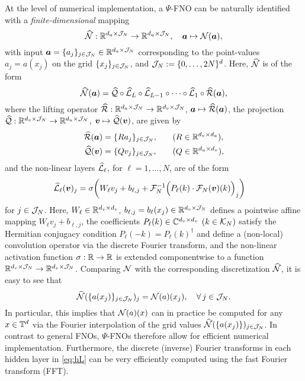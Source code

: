 \documentclass[reqno,a4paper]{amsart}
\begin{document}
At the level of numerical implementation, a {$\Psi$-FNO} can be naturally identified with a \emph{finite-dimensional} mapping
\[
\widehat{\mathcal{N}}: \mathbb{R}^{d_a \times \mathcal{J}_N} \to \mathbb{R}^{d_u \times \mathcal{J}_N}, \quad \bm{a} \mapsto \mathcal{N}(\bm{a}),
\]
with input $\bm{a} = \{a_j\}_{j\in \mathcal{J}_N} \in \mathbb{R}^{d_a\times \mathcal{J}_N}$ corresponding to the point-values $a_j = a(x_j)$ on the grid $\{x_j\}_{j\in \mathcal{J}_N}$, and $\mathcal{J}_N:=\{0,\dots, 2N\}^d$. Here, $\widehat{\mathcal{N}}$ is of the form 
\[
\widehat{\mathcal{N}}(\bm{a}) 
=
\widehat{\mathcal{Q}} \circ \widehat{\mathcal{L}}_L \circ \widehat{\mathcal{L}}_{L-1} \circ \dots \circ \widehat{\mathcal{L}}_1 \circ \widehat{\mathcal{R}}(\bm{a}),
\]
where the lifting operator $\widehat{\mathcal{R}}: \mathbb{R}^{d_a\times \mathcal{J}_N} \to \mathbb{R}^{d_v\times \mathcal{J}_N}$, $\bm{a} \mapsto \widehat{\mathcal{R}}(\bm{a})$, the projection $\widehat{\mathcal{Q}}: \mathbb{R}^{d_v\times \mathcal{J}_N} \to \mathbb{R}^{d_u \times \mathcal{J}_N}$, $\bm{v}\mapsto \widehat{\mathcal{Q}}(\bm{v})$, are given by
\begin{alignat*}{2}
\widehat{\mathcal{R}}(\bm{a}) &= \{Ra_j\}_{j\in \mathcal{J}_N}, && (R \in \mathbb{R}^{d_v\times d_a}),
\\
\widehat{\mathcal{Q}}(\bm{v}) &= \{ Qv_j\}_{j\in \mathcal{J}_N},\quad  && (Q \in \mathbb{R}^{d_u\times d_v}), 
\end{alignat*}
and the non-linear layers $\widehat{\mathcal{L}}_{\ell}$, for $\ell=1,\dots, N$, are of the form 
\begin{align}
\label{eq:hL}
\widehat{\mathcal{L}}_\ell(\bm{v})_j &= 
\sigma\bigg(
W_\ell v_j + b_{\ell,j} + \mathcal{F}_N^{-1}\Big(P_\ell(k) \cdot \mathcal{F}_N(\bm{v})(k)\Big)_j
\bigg)
\end{align}
for $j\in \mathcal{J}_N$. Here, $W_\ell\in \mathbb{R}^{d_v\times d_v}$, $b_{\ell,j} = b_\ell(x_j) \in \mathbb{R}^{d_v \times \mathcal{J}_N}$ defines a pointwise affine mapping $W_\ell v_j + b_{\ell,j}$, the coefficients $P_\ell(k) \in \mathbb{C}^{d_v\times d_v}$ $(k\in \mathcal{K}_N)$ satisfy the Hermitian conjugacy condition $P_\ell(-k) = P_\ell(k)^\dagger$ and define a (non-local) convolution operator via the discrete Fourier transform, and the non-linear activation function $\sigma: \mathbb{R} \to \mathbb{R}$ is extended componentwise to a function $\mathbb{R}^{d_v\times \mathcal{J}_N} \to \mathbb{R}^{d_v\times \mathcal{J}_N}$. Comparing $\mathcal{N}$ with the corresponding discretization $\widehat{\mathcal{N}}$, it is easy to see that 
\[
\widehat{\mathcal{N}}(\{a(x_j)\}_{j\in \mathcal{J}_N})_j 
=
\mathcal{N}(a)(x_j), 
\quad
\forall \, j\in \mathcal{J}_N.
\]
In particular, this implies that $\mathcal{N}(a)(x)$ can in practice be computed for any $x\in \mathbb{T}^d$ via the Fourier interpolation of the grid values $\widehat{\mathcal{N}}(\{a(x_j)\})_{j\in \mathcal{J}_N}$. In contrast to general FNOs, $\Psi$-FNOs therefore allow for efficient numerical implementation. Furthermore, the discrete (inverse) Fourier transforms in each hidden layer in \eqref{eq:hL} can be very efficiently computed using the fast Fourier transform (FFT).  
\end{document}

